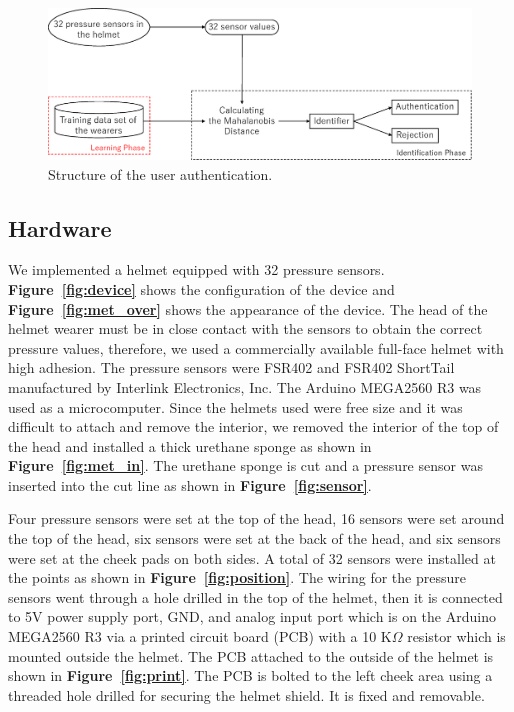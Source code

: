 \documentclass[sigchi,authordraft]{acmart}
\newcommand\figref[1]{\textbf{Figure~\ref{fig:#1}}}
\begin{document}
\begin{figure}[!t]
  \centering
    \includegraphics[width=1\linewidth]{figure/system_mahalanobis.eps}
  \caption{Structure of the user authentication.}
  \label{fig:system_mahalanobis}
\end{figure}

\subsection{Hardware}
We implemented a helmet equipped with 32 pressure sensors. \figref{device} shows the configuration of the device and \figref{met_over} shows the appearance of the device.
The head of the helmet wearer must be in close contact with the sensors to obtain the correct pressure values, therefore, we used a commercially available full-face helmet with high adhesion. The pressure sensors were FSR402 and FSR402 ShortTail manufactured by Interlink Electronics, Inc. The Arduino MEGA2560 R3 was used as a microcomputer. Since the helmets used were free size and it was difficult to attach and remove the interior, we removed the interior of the top of the head and installed a thick urethane sponge as shown in \figref{met_in}. The urethane sponge is cut and a pressure sensor was inserted into the cut line as shown in \figref{sensor}. 

Four pressure sensors were set at the top of the head, 16 sensors were set around the top of the head, six sensors were set at the back of the head, and six sensors were set at the cheek pads on both sides. A total of 32 sensors were installed at the points as shown in \figref{position}. The wiring for the pressure sensors went through a hole drilled in the top of the helmet, then it is connected to 5V power supply port, GND, and analog input port which is on the Arduino MEGA2560 R3 via a printed circuit board (PCB) with a 10 K$\Omega$ resistor which is mounted outside the helmet. The PCB attached to the outside of the helmet is shown in \figref{print}. The PCB is bolted to the left cheek area using a threaded hole drilled for securing the helmet shield. It is fixed and removable.
\end{document}
